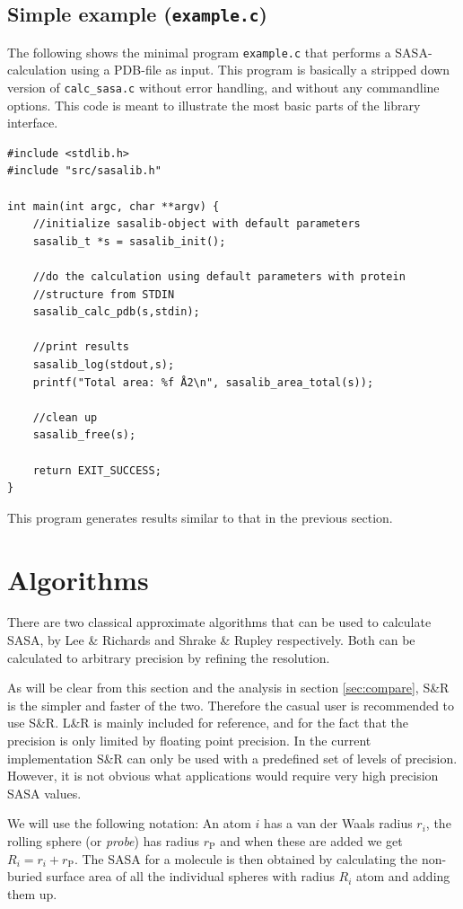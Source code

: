 \documentclass[a4paper,11pt]{article}
\begin{document}
\subsection{Simple example (\texttt{example.c})}\label{sec:simple_sample}

The following shows the minimal program \texttt{example.c} that
performs a SASA-calculation using a PDB-file as input. This program is
basically a stripped down version of \texttt{calc\_sasa.c} without
error handling, and without any commandline options. This code is
meant to illustrate the most basic parts of the library interface.
\begin{verbatim}
#include <stdlib.h>
#include "src/sasalib.h"

int main(int argc, char **argv) { 
    //initialize sasalib-object with default parameters
    sasalib_t *s = sasalib_init();

    //do the calculation using default parameters with protein
    //structure from STDIN
    sasalib_calc_pdb(s,stdin);

    //print results
    sasalib_log(stdout,s);
    printf("Total area: %f Å2\n", sasalib_area_total(s));

    //clean up
    sasalib_free(s);

    return EXIT_SUCCESS;
}
\end{verbatim}
This program generates results similar to that in the previous
section.

\section{Algorithms}\label{sec:alg}

There are two classical approximate algorithms that can be used to
calculate SASA, by Lee \& Richards \cite{LnR} and Shrake \& Rupley
\cite{SnR} respectively. Both can be calculated to arbitrary precision
by refining the resolution. 

As will be clear from this section and the analysis in section
\ref{sec:compare}, S\&R is the simpler and faster of the
two. Therefore the casual user is recommended to use S\&R. L\&R is
mainly included for reference, and for the fact that the precision is
only limited by floating point precision. In the current
implementation S\&R can only be used with a predefined set of levels
of precision. However, it is not obvious what applications would
require very high precision SASA values.

We will use the following notation: An atom $i$ has a van der Waals
radius $r_i$, the rolling sphere (or \emph{probe}) has radius
$r_\text{P}$ and when these are added we get $R_i = r_i +
r_\text{P}$. The SASA for a molecule is then obtained by calculating
the non-buried surface area of all the individual spheres with radius
$R_i$ atom and adding them up.
\end{document}
